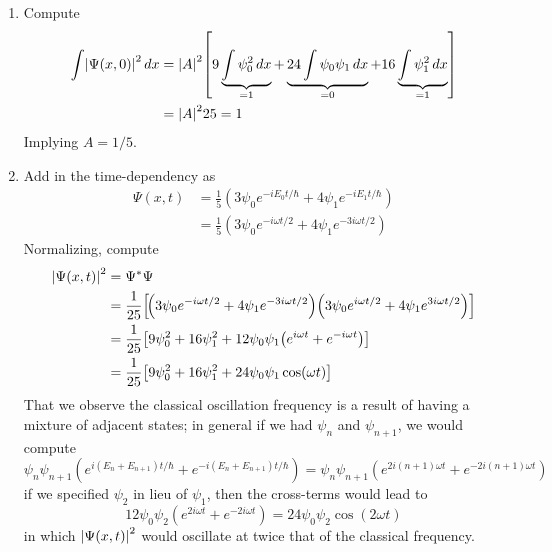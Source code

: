 \documentclass[a4paper]{article}
\begin{document}
\begin{enumerate}[label=(\alph*)]
	\item Compute
	\begin{align*}
		\int \abs{\Psi \!\left( x,0 \right)}^{2} \, dx & = \abs{A}^{2}\!\left[ 9 \underbrace{\int \psi_{0}^{2} \, dx}_{= 1} + \underbrace{24 \int \psi_{0}\psi_{1} \, dx}_{= 0} + 16 \underbrace{\int \psi_{1}^{2} \, dx}_{= 1} \right] \\
		 & = \abs{A}^{2} 25 = 1 
	\end{align*}
	Implying \( A = 1 / 5 \).
	\item Add in the time-dependency as 
	\begin{align*}
		\Psi \!\left( x,t \right) & = \frac{1}{5}\!\left( 3 \psi_{0}e^{-i E_{0}t / \hbar} + 4 \psi_{1}e^{-iE_{1}t / \hbar} \right) \\
					  & = \frac{1}{5}\!\left( 3 \psi_{0}e^{-i \omega t / 2} + 4 \psi_{1}e^{-3i \omega t / 2} \right)
	\end{align*}
	Normalizing, compute
	\begin{align*}
		\abs{\Psi \!\left( x,t \right)}^{2} & = \Psi^{*}\Psi \\
						    & = \frac{1}{25}\!\left[ \!\left( 3 \psi_{0}e^{-i \omega t / 2} + 4 \psi_{1}e^{-3i \omega t / 2} \right)\!\left( 3 \psi_{0}e^{i \omega t / 2} + 4 \psi_{1}e^{3i \omega t / 2} \right) \right] \\ 
						    & = \frac{1}{25}\!\left[ 9 \psi_{0}^{2} + 16 \psi_{1}^{2} + 12 \psi_{0}\psi_{1}\!\left( e^{i \omega t} + e^{-i \omega t} \right) \right] \\
						    & = \frac{1}{25}\!\left[ 9 \psi_{0}^{2} + 16 \psi_{1}^{2} + 24 \psi_{0}\psi_{1}\cos\!\left(\omega t\right) \right]
	\end{align*}
	That we observe the classical oscillation frequency is a result of having a mixture of adjacent states; in general if we had \( \psi_{n} \) and \( \psi_{n + 1} \), we would compute
	\[
		\psi_{n}\psi_{n + 1}\!\left( e^{i \!\left( E_{n} + E_{n + 1} \right) t / \hbar} + e^{-i \!\left( E_{n} + E_{n + 1} \right)t / \hbar} \right) = \psi_{n}\psi_{n + 1}\!\left( e^{2i \!\left( n + 1 \right)\omega t} + e^{-2i \!\left( n + 1 \right)\omega t} \right)
	\]
	if we specified \( \psi_{2} \) in lieu of \( \psi_{1} \), then the cross-terms would lead to
	\[
		12 \psi_{0}\psi_{2} \!\left( e^{2i \omega t} + e^{-2i \omega t} \right) = 24 \psi_{0}\psi_{2}\cos\!\left(2 \omega t\right) 
	\]
	in which \( \abs{\Psi \!\left( x,t \right)}^{2} \) would oscillate at twice that of the classical frequency.
\end{enumerate}
\end{document}
